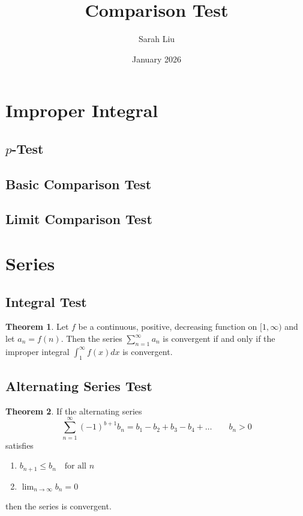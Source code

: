 \documentclass{article}
\title{Comparison Test}
\author{Sarah Liu}
\date{January 2026}
\theoremstyle{definition}
\newtheorem{theorem}{Theorem}[section]
\theoremstyle{remark}
\begin{document}
\maketitle

\section{Improper Integral}
\subsection{$p$-Test}
\subsection{Basic Comparison Test}
\subsection{Limit Comparison Test}

\section{Series}
\subsection{Integral Test}

\begin{theorem}
    Let $f$ be a continuous, positive, decreasing function on $[1,\infty)$ and let $a_n=f(n)$.
    Then the series $\sum_{n=1}^\infty a_n$ is convergent if and only if the improper integral $\int_1^{\infty}f(x)dx$ is convergent.
\end{theorem}

\subsection{Alternating Series Test}

\begin{theorem}
    If the alternating series
    \[
    \sum_{n=1}^{\infty}(-1)^{b+1}b_n=b_1-b_2+b_3-b_4+\dots \qquad b_n>0
    \]
    satisfies
    \begin{enumerate}
        \item $b_{n+1}\leq b_n \quad \text{for all }n$
        \item $\lim_{n\rightarrow \infty}b_n =0$
    \end{enumerate}
    then the series is convergent.
\end{theorem}
\end{document}
